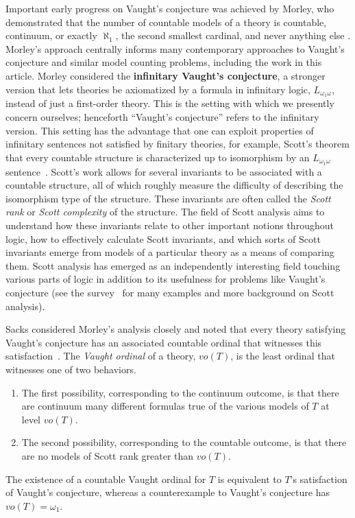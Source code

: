 \documentclass[10pt,a4paper]{amsart}
\renewcommand{\-}{\text{-}}
\begin{document}
Important early progress on Vaught's conjecture was achieved by Morley, who demonstrated that the number of countable models of a theory is countable, continuum, or exactly $\aleph_1$, the second smallest cardinal, and never anything else \cite{Mor70}.
Morley's approach centrally informs many contemporary approaches to Vaught's conjecture and similar model counting problems, including the work in this article.
Morley considered the \textbf{infinitary Vaught's conjecture}, a stronger version that lets theories be axiomatized by a formula in infinitary logic, $L_{\omega_1\omega}$, instead of just a first-order theory.
This is the setting with which we presently concern ourselves; henceforth ``Vaught's conjecture'' refers to the infinitary version.
This setting has the advantage that one can exploit properties of infinitary sentences not satisfied by finitary theories, for example, Scott's theorem that every countable structure is characterized up to isomorphism by an $L_{\omega_1\omega}$ sentence~\cite{Sco65}.
Scott's work allows for several invariants to be associated with a countable structure, all of which roughly measure the difficulty of describing the isomorphism type of the structure.
These invariants are often called the \emph{Scott rank} or \emph{Scott complexity} of the structure.
The field of Scott analysis aims to understand how these invariants relate to other important notions throughout logic, how to effectively calculate Scott invariants, and which sorts of Scott invariants emerge from models of a particular theory as a means of comparing them.
Scott analysis has emerged as an independently interesting field touching various parts of logic in addition to its usefulness for problems like Vaught's conjecture (see the survey~\cite{HT22} for many examples and more background on Scott analysis).

Sacks considered Morley's analysis closely and noted that every theory satisfying Vaught's conjecture has an associated countable ordinal that witnesses this satisfaction~\cite{Sac07}.
The \emph{Vaught ordinal} of a theory, $vo(T)$, is the least ordinal that witnesses one of two behaviors.
\begin{enumerate}
 \tightlist
 \item The first possibility, corresponding to the continuum outcome, is that there are continuum many different formulas true of the various models of $T$ at level $vo(T)$.
 \item The second possibility, corresponding to the countable outcome, is that there are no models of Scott rank greater than $vo(T)$.
\end{enumerate}
The existence of a countable Vaught ordinal for $T$ is equivalent to $T$'s satisfaction of Vaught's conjecture, whereas a counterexample to Vaught's conjecture has $vo(T)=\omega_1$.
\end{document}
